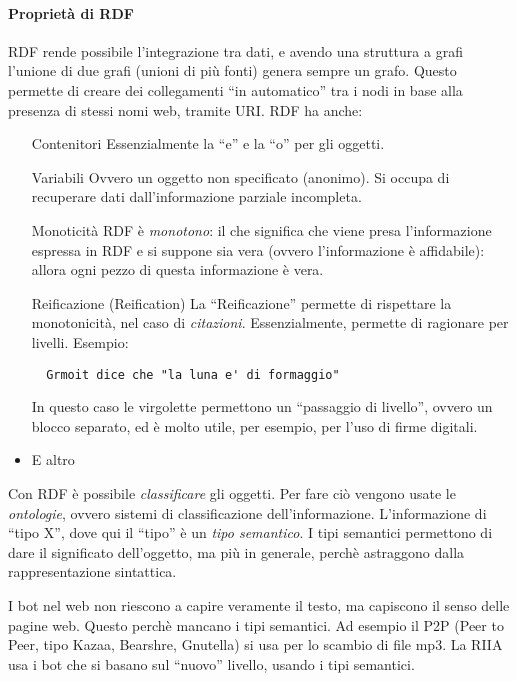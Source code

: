 \paragraph*{Propriet\`a di RDF}RDF rende possibile l'integrazione tra dati, e avendo una struttura a grafi l'unione di due grafi (unioni di pi\`u fonti) genera sempre un grafo. Questo permette di creare dei collegamenti ``in automatico'' tra i nodi in base alla presenza di stessi nomi web, tramite URI.
RDF ha anche:
\begin{itemize}

\item[Contenitori] Essenzialmente la ``e'' e la ``o'' per gli oggetti.
\item[Variabili] Ovvero un oggetto non specificato (anonimo). Si occupa di recuperare dati dall'informazione parziale incompleta.
\item[Monoticit\`a] RDF \`e \textit{monotono}: il che significa che viene presa l'informazione espressa in RDF e si suppone sia vera (ovvero l'informazione \`e affidabile): allora ogni pezzo di questa informazione \`e vera.
\item[Reificazione] (Reification) La ``Reificazione'' permette di rispettare la monotonicit\`a, nel caso di \textit{citazioni}. Essenzialmente, permette di ragionare per livelli. Esempio:
\begin{verbatim}
  Grmoit dice che "la luna e' di formaggio"
\end{verbatim}
In questo caso le virgolette permettono un ``passaggio di livello'', ovvero un blocco separato, ed \`e molto utile, per esempio, per l'uso di firme digitali.

\item E altro %

\end{itemize}

Con RDF \`e possibile \textit{classificare} gli oggetti. Per fare ci\`o vengono usate le \textit{ontologie}, ovvero sistemi di classificazione dell'informazione. L'informazione di ``tipo X'', dove qui il ``tipo'' \`e un \textit{tipo semantico}. I tipi semantici permettono di dare il significato dell'oggetto, ma pi\`u in generale, perch\`e astraggono dalla rappresentazione sintattica.

I bot nel web non riescono a capire veramente il testo, ma capiscono il senso delle pagine web. Questo perch\`e mancano i tipi semantici. Ad esempio il P2P (Peer to Peer, tipo Kazaa, Bearshre, Gnutella) si usa per lo scambio di file mp3. La RIIA usa i bot che si basano sul ``nuovo'' livello, usando i tipi semantici.


